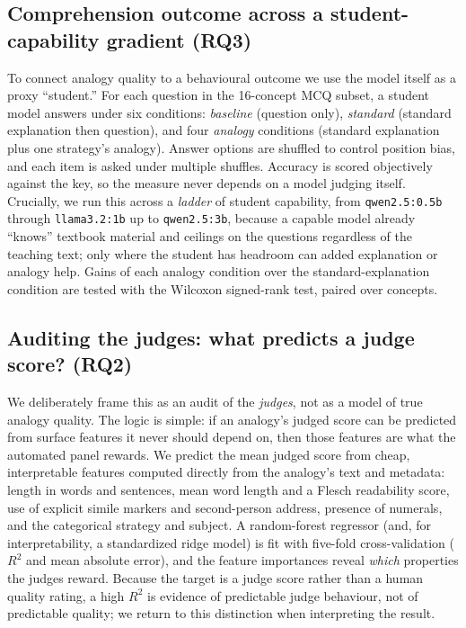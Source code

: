\documentclass[11pt]{article}
\newcommand{\result}[1]{#1}  %
\begin{document}
\subsection{Comprehension outcome across a student-capability gradient (RQ3)}
\label{sec:method:comprehension}
To connect analogy quality to a behavioural outcome we use the model itself as a
proxy ``student.'' For each question in the \result{16}-concept MCQ subset, a
student model answers under six conditions: \emph{baseline} (question only),
\emph{standard} (standard explanation then question), and four \emph{analogy}
conditions (standard explanation plus one strategy's analogy). Answer options are
shuffled to control position bias, and each item is asked under multiple shuffles.
Accuracy is scored objectively against the key, so the measure never depends on a
model judging itself. Crucially, we run this across a \emph{ladder} of student
capability, from \texttt{qwen2.5:0.5b} through \texttt{llama3.2:1b} up to
\texttt{qwen2.5:3b}, because a capable model already ``knows'' textbook material
and ceilings on the questions regardless of the teaching text; only where the
student has headroom can added explanation or analogy help. Gains of each analogy
condition over the standard-explanation condition are tested with the Wilcoxon
signed-rank test, paired over concepts.

\subsection{Auditing the judges: what predicts a judge score? (RQ2)}
\label{sec:method:rq2}
We deliberately frame this as an audit of the \emph{judges}, not as a model of true
analogy quality. The logic is simple: if an analogy's judged score can be predicted
from surface features it never should depend on, then those features are what the
automated panel rewards. We predict the mean judged score from cheap, interpretable
features computed directly from the analogy's text and metadata: length in words and
sentences, mean word length and a Flesch readability score, use of explicit simile
markers and second-person address, presence of numerals, and the categorical strategy
and subject. A random-forest regressor (and, for interpretability, a standardized ridge
model) is fit with five-fold cross-validation ($R^2$ and mean absolute error), and the
feature importances reveal \emph{which} properties the judges reward. Because the target
is a judge score rather than a human quality rating, a high $R^2$ is evidence of
predictable judge behaviour, not of predictable quality; we return to this distinction
when interpreting the result.
\end{document}

